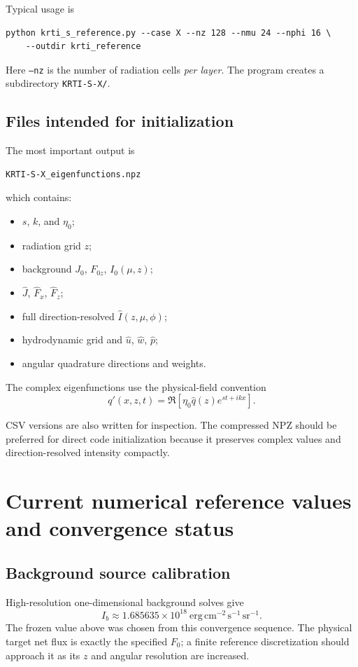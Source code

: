 \documentclass[11pt]{article}
\newcommand{\Ihat}{\widehat I}
\newcommand{\Jhat}{\widehat J}
\newcommand{\whatv}{\widehat w}
\newcommand{\uhat}{\widehat u}
\newcommand{\phat}{\widehat p}
\begin{document}
Typical usage is
\begin{lstlisting}
python krti_s_reference.py --case X --nz 128 --nmu 24 --nphi 16 \
    --outdir krti_reference
\end{lstlisting}
Here \texttt{--nz} is the number of radiation cells \emph{per layer}. The program creates a subdirectory \texttt{KRTI-S-X/}.

\subsection{Files intended for initialization}
The most important output is
\begin{lstlisting}
KRTI-S-X_eigenfunctions.npz
\end{lstlisting}
which contains:
\begin{itemize}[leftmargin=2em]
\item $s$, $k$, and $\eta_0$;
\item radiation grid $z$;
\item background $J_0$, $F_{0z}$, $I_0(\mu,z)$;
\item $\Jhat$, $\widehat F_x$, $\widehat F_z$;
\item full direction-resolved $\Ihat(z,\mu,\phi)$;
\item hydrodynamic grid and $\uhat$, $\whatv$, $\phat$;
\item angular quadrature directions and weights.
\end{itemize}
The complex eigenfunctions use the physical-field convention
\begin{equation}
q'(x,z,t)=\Re[\eta_0\widehat q(z)e^{st+ikx}].
\end{equation}

CSV versions are also written for inspection. The compressed NPZ should be preferred for direct code initialization because it preserves complex values and direction-resolved intensity compactly.

\section{Current numerical reference values and convergence status}

\subsection{Background source calibration}
High-resolution one-dimensional background solves give
\begin{equation}
I_b\approx1.685635\times10^{18}\ \mathrm{erg\,cm^{-2}\,s^{-1}\,sr^{-1}}.
\end{equation}
The frozen value above was chosen from this convergence sequence. The physical target net flux is exactly the specified $F_0$; a finite reference discretization should approach it as its $z$ and angular resolution are increased.
\end{document}
